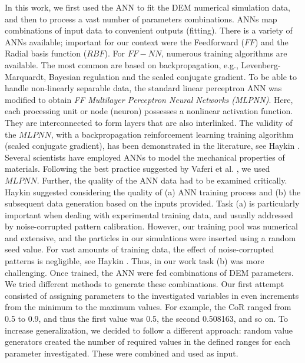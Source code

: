 In this work, we first used the \acs{ANN} to fit the \acs{DEM} numerical simulation
data, and then to process a vast number of parameters combinations. 
\acs{ANNs} map combinations of input data to convenient outputs (fitting). 
There is a variety of \acs{ANNs} available; important for our context were the
Feedforward ($FF$) and the Radial basis function ($RBF$). For $FF-NN$, 
numerous training algorithms are available. The most common are based on
backpropagation, e.g., Levenberg-Marquardt, Bayesian regulation and the scaled
conjugate gradient.
To be able to handle non-linearly separable data, the standard linear perceptron
\acs{ANN} was modified to obtain \textit{FF Multilayer Perceptron Neural Networks
(MLPNN)}.
Here, each processing unit or node (neuron) possesses a nonlinear activation function. 
They are interconnected to form layers that are also interlinked. 
The validity of the $MLPNN$, with a backpropagation reinforcement learning 
training algorithm (scaled conjugate gradient), has been demonstrated in the 
literature, see Haykin \cite{RefWorks:158}. Several scientists 
\cite{RefWorks:161, RefWorks:166, RefWorks:167, RefWorks:168, RefWorks:169,
RefWorks:170, RefWorks:178, RefWorks:179} have employed \acs{ANNs} to model
the mechanical properties of materials.
Following the best practice suggested by Vaferi et al. \cite{RefWorks:150}, we
used $MLPNN$.
Further, the quality of the \acs{ANN} data had to be examined critically. 
Haykin \cite{RefWorks:158} 
suggested considering the quality of (a) \acs{ANN} training process and (b) the
subsequent data generation based on the inputs provided.
Task (a) is particularly important
when dealing with experimental training data, and
usually addressed
by noise-corrupted pattern calibration.
However, our training pool was numerical and extensive, 
and the particles in our simulations were inserted using a random
seed value.
For vast amounts of training data, the effect of noise-corrupted patterns is
negligible, see Haykin \cite{RefWorks:158}.
Thus, in our work task (b) was more challenging.
Once trained, the \acs{ANN} were fed
combinations of \acs{DEM} parameters. 
We tried different methods to generate these combinations. 
Our first attempt consisted of assigning parameters to the investigated
variables in even increments from the minimum to the maximum values. 
For example, the \acs{CoR} ranged from 0.5 to 0.9, and thus the first value was
0.5, the second 0.508163, and so on.
To increase generalization, we decided to follow a different approach: 
random value generators created the number of required values in the defined
ranges for each parameter investigated.
These were combined and used as input.\\
